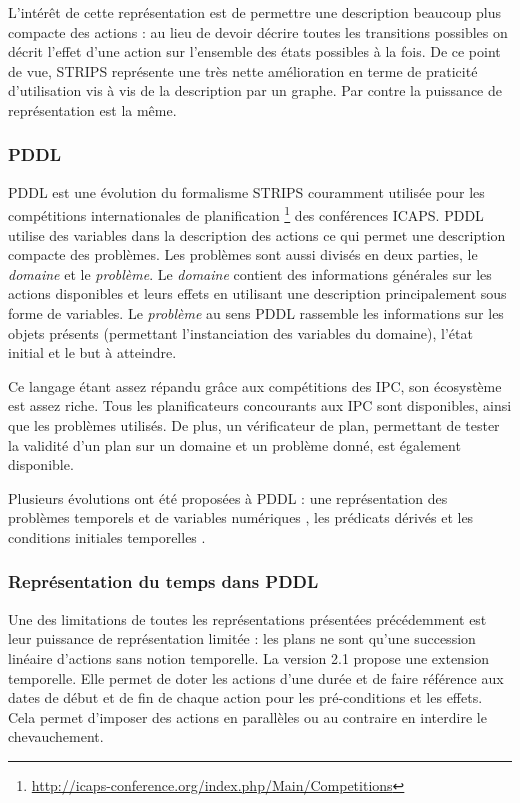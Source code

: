 L'intérêt de cette représentation est de permettre une description beaucoup plus compacte des actions : au lieu de devoir décrire toutes les transitions possibles on décrit l'effet d'une action sur l'ensemble des états possibles à la fois. De ce point de vue, STRIPS représente une très nette amélioration en terme de praticité d'utilisation vis à vis de la description par un graphe. Par contre la puissance de représentation est la même.

\subsubsection{PDDL}

PDDL \cite{pddl1998} est une évolution du formalisme STRIPS couramment utilisée pour les compétitions internationales de planification \footnote{\url{http://icaps-conference.org/index.php/Main/Competitions}} des conférences ICAPS.
PDDL utilise des variables dans la description des actions ce qui permet une description compacte des problèmes.
Les problèmes sont aussi divisés en deux parties, le \emph{domaine} et le \emph{problème}.
Le \emph{domaine} contient des informations générales sur les actions disponibles et leurs effets en utilisant une description principalement sous forme de variables.
Le \emph{problème} au sens PDDL rassemble les informations sur les objets présents (permettant l'instanciation des variables du domaine), l'état initial et le but à atteindre.

Ce langage étant assez répandu grâce aux compétitions des IPC, son écosystème est assez riche. 
Tous les planificateurs concourants aux IPC sont disponibles, ainsi que les problèmes utilisés.
De plus, un vérificateur de plan, permettant de tester la validité d'un plan sur un domaine et un problème donné, est également disponible.

Plusieurs évolutions ont été proposées à PDDL : une représentation des problèmes temporels et de variables numériques \cite{Fox2003}, les prédicats dérivés et les conditions initiales temporelles \cite{Edelkamp2004}.%

\subsubsection*{Représentation du temps dans PDDL}
\label{sec:pddl_time}

Une des limitations de toutes les représentations présentées précédemment est leur puissance de représentation limitée : les plans ne sont qu'une succession linéaire d'actions sans notion temporelle. 
La version 2.1 \cite{Fox2003} propose une extension temporelle. 
Elle permet de doter les actions d'une durée et de faire référence aux dates de début et de fin de chaque action pour les pré-conditions et les effets.
Cela permet d'imposer des actions en parallèles ou au contraire en interdire le chevauchement.

